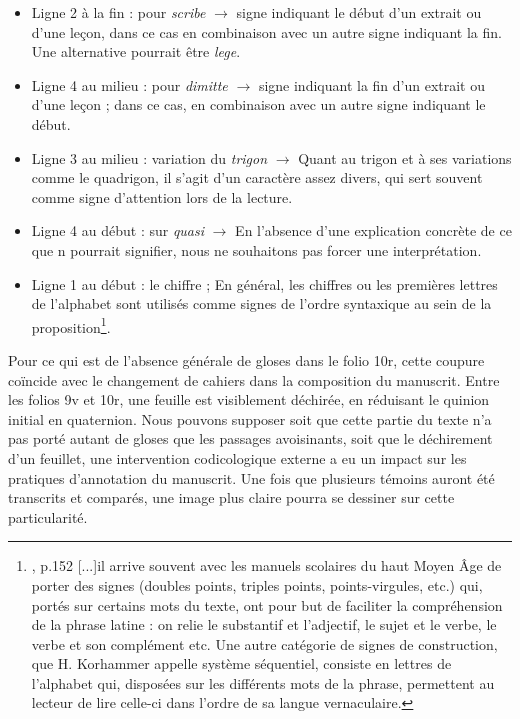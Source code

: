 \documentclass[a4paper, twoside, 12pt]{book}
\begin{document}
{\begin{itemize}
    \item Ligne 2 à la fin :   pour \textit{scribe} $\rightarrow$ signe indiquant le début d'un extrait ou d'une leçon, dans ce cas en combinaison avec un autre signe indiquant la fin. Une alternative pourrait être \textit{lege}.
    \item Ligne 4 au milieu :  pour \textit{dimitte} $\rightarrow$ signe indiquant la fin d'un extrait ou d'une leçon ; dans ce cas, en combinaison avec un autre signe indiquant le début.
    \item Ligne 3 au milieu : variation du \textit{trigon} $\rightarrow$ Quant au trigon et à ses variations comme le quadrigon, il s'agit d'un caractère assez divers, qui sert souvent comme signe d'attention lors de la lecture. 
     \item Ligne 4 au début :   sur \textit{quasi} $\rightarrow$ En l'absence d'une explication concrète de ce que \og{}n\fg{} pourrait signifier, nous ne souhaitons pas forcer une interprétation.
    \item Ligne 1 au début : le chiffre   ; En général, les chiffres ou les premières lettres de l'alphabet sont utilisés comme signes de l'ordre syntaxique au sein de la proposition\footnote{\cite{lemoine1989symptomes}, p.152 \og{}[...]il arrive souvent avec les manuels scolaires du haut Moyen Âge de porter des signes (doubles points, triples points, points-virgules, etc.) qui, portés sur certains mots du texte, ont pour but de faciliter la compréhension de la phrase latine : on relie le substantif et l’adjectif, le sujet et le verbe, le verbe et son complément etc. Une autre catégorie de signes de construction, que H. Korhammer appelle système séquentiel, consiste en lettres de l’alphabet qui, disposées sur les différents mots de la phrase, permettent au lecteur de lire celle-ci dans l’ordre de sa langue vernaculaire.\fg{}}.  
\end{itemize}

Pour ce qui est de l'absence générale de gloses dans le folio 10r, cette coupure coïncide avec le changement de cahiers dans la composition du manuscrit. Entre les folios 9v et 10r, une feuille est visiblement déchirée, en réduisant le quinion initial en quaternion. Nous pouvons supposer soit que cette partie du texte n'a pas porté autant de gloses que les passages avoisinants, soit que le déchirement d'un feuillet, une intervention codicologique externe a eu un impact sur les pratiques d'annotation du manuscrit. Une fois que plusieurs témoins auront été transcrits et comparés, une image plus claire pourra se dessiner sur cette particularité.\\

}
\end{document}
